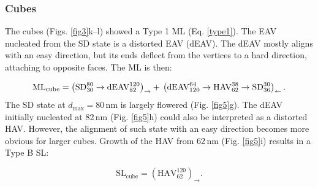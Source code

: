\documentclass[review,authoryear]{elsarticle}
\newcommand{\dmax}{d_\text{max}}
\newcommand{\nm}{\,\text{nm}}
\begin{document}
\subsubsection{Cubes}
The cubes (Figs. \ref{fig3}k--l) showed a Type 1 ML (Eq. \ref{type1}). The EAV nucleated from the SD state is a distorted EAV (dEAV). The dEAV mostly aligns with an easy direction, but its ends deflect from the vertices to a hard direction, attaching to opposite faces. The ML is then:
{\par\nobreak\noindent}
\begin{equation}
\text{ML}_{\text{cube}}=\left(\text{SD}_{30}^{80}\rightarrow\text{dEAV}_{82}^{120}\right)_{\rightarrow} + \\
\left(\text{dEAV}_{120}^{64}\rightarrow\text{HAV}_{62}^{38}\rightarrow\text{SD}_{36}^{30}\right)_{\leftarrow}.
\end{equation}
The SD state at $\dmax=80\,\text{nm}$ is largely flowered (Fig. \ref{fig5}g). The dEAV initially nucleated at 82$\nm$ (Fig. \ref{fig5}h) could also be interpreted as a distorted HAV. However, the alignment of such state with an easy direction becomes more obvious for larger cubes. Growth of the HAV from 62$\nm$ (Fig. \ref{fig5}i) results in a Type B SL:
{\par\nobreak\noindent}
\begin{equation}
\text{SL}_{\text{cube}}=\left(\text{HAV}_{62}^{120}\right)_{\rightarrow}.
\end{equation}
\par
\end{document}
